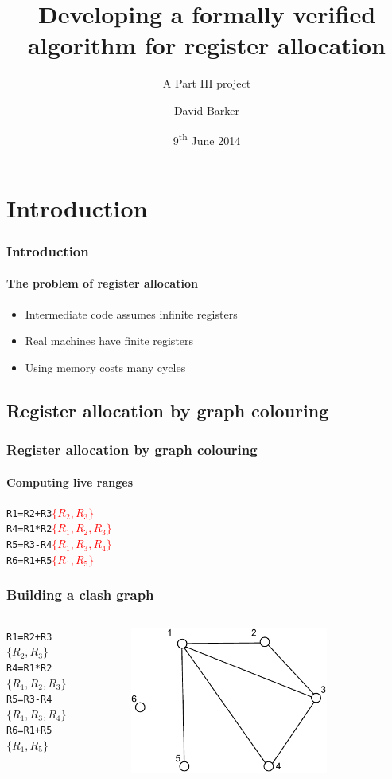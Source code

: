 \documentclass{beamer}
\title[Verified register allocation]{Developing a formally verified algorithm for register allocation}
\subtitle{A Part III project}
\author{David Barker}
\date{9\textsuperscript{th} June 2014}
\begin{document}
\frame{\titlepage}

\section{Introduction}

\begin{frame}
\frametitle{Introduction}
\framesubtitle{The problem of register allocation}

\begin{itemize}
	\item Intermediate code assumes infinite registers
	\item Real machines have finite registers
	\item Using memory costs many cycles
\end{itemize}
\end{frame}

\subsection{Register allocation by graph colouring}
\begin{frame}[containsverbatim]
\frametitle{Register allocation by graph colouring}
\framesubtitle{Computing live ranges}
\begin{center}
\begin{alltt}
R1 = R2 + R3  \textcolor{red}{\(\{R_2, R_3\}\)}
R4 = R1 * R2  \textcolor{red}{\(\{R_1, R_2, R_3\}\)}
R5 = R3 - R4  \textcolor{red}{\(\{R_1, R_3, R_4\}\)}
R6 = R1 + R5  \textcolor{red}{\(\{R_1, R_5\}\)}
\end{alltt}
\end{center}
\end{frame}

\begin{frame}[containsverbatim]
\frametitle{Building a clash graph}
\begin{columns}[c]
\begin{alltt}
R1 = R2 + R3  \(\{R_2, R_3\}\)
R4 = R1 * R2  \(\{R_1, R_2, R_3\}\)
R5 = R3 - R4  \(\{R_1, R_3, R_4\}\)
R6 = R1 + R5  \(\{R_1, R_5\}\)
\end{alltt}
\begin{figure}[!ht]
  \centering
  \includegraphics[width=0.8\textwidth]{graph.pdf}
\end{figure}
\end{columns}
\end{frame}
\end{document}
